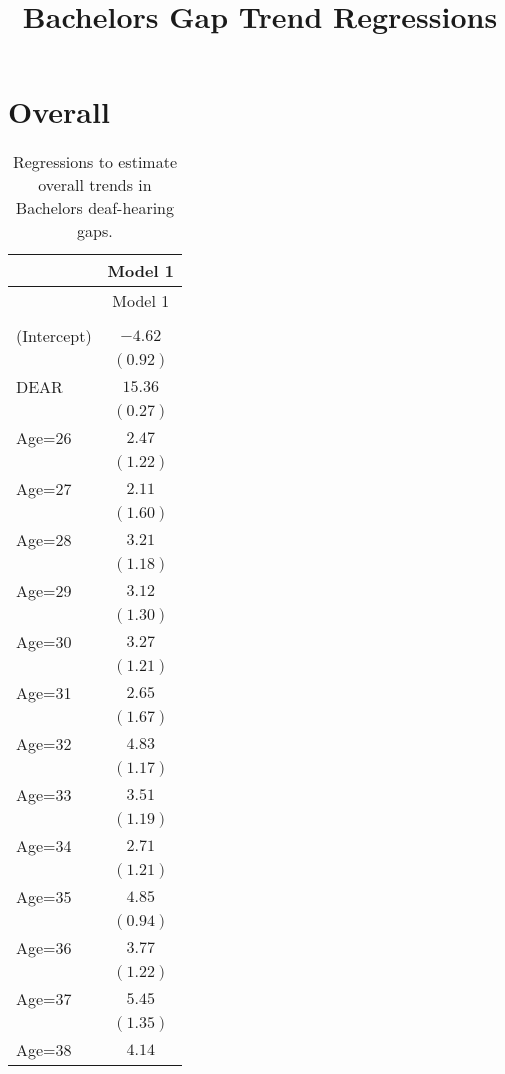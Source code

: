 \documentclass[fullpage]{paper}
\title{ Bachelors Gap Trend Regressions}
\begin{document}
\section{Overall}

\begin{center}
\begin{longtable}{l c }
\hline
 & Model 1 \\
\hline
\endfirsthead
\hline
 & Model 1 \\
\hline
\endhead
\hline
\endfoot
\hline
\multicolumn{2}{l}{\scriptsize{}}\\
\caption{Regressions to estimate overall trends in Bachelors deaf-hearing gaps.}
\label{table:coefficients}
\endlastfoot
(Intercept) & $-4.62$  \\
            & $(0.92)$ \\
DEAR        & $15.36$  \\
            & $(0.27)$ \\
Age=26      & $2.47$   \\
            & $(1.22)$ \\
Age=27      & $2.11$   \\
            & $(1.60)$ \\
Age=28      & $3.21$   \\
            & $(1.18)$ \\
Age=29      & $3.12$   \\
            & $(1.30)$ \\
Age=30      & $3.27$   \\
            & $(1.21)$ \\
Age=31      & $2.65$   \\
            & $(1.67)$ \\
Age=32      & $4.83$   \\
            & $(1.17)$ \\
Age=33      & $3.51$   \\
            & $(1.19)$ \\
Age=34      & $2.71$   \\
            & $(1.21)$ \\
Age=35      & $4.85$   \\
            & $(0.94)$ \\
Age=36      & $3.77$   \\
            & $(1.22)$ \\
Age=37      & $5.45$   \\
            & $(1.35)$ \\
Age=38      & $4.14$   \\

\end{longtable}
\end{center}
\end{document}

